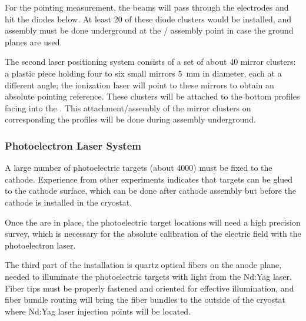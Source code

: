 For the pointing measurement, the beams will pass through the  electrodes and hit the diodes below. At least \num{20} of these diode clusters would be installed, and assembly must be done underground at the / assembly point in case the ground planes are used.


The second laser positioning system consists of a set of about \num{40} mirror clusters: a plastic piece holding four to six small mirrors \SI{5}{\mm} in diameter, each at a different angle; the ionization laser will point to these mirrors to obtain an absolute pointing reference. These clusters will be attached to the bottom  profiles facing into the . 
This attachment/assembly of the mirror clusters on corresponding the  profiles will be done during  assembly underground.



\subsubsection{Photoelectron Laser System} 
A large number of photoelectric targets (about \num{4000}) must be fixed to the cathode. Experience from other experiments indicates that targets can be glued to the cathode surface, which can be done after cathode assembly but before the cathode is installed in the cryostat. 

Once the  are in place, the photoelectric target locations will need a high precision survey, which is necessary for the absolute calibration of the electric field with the photoelectron laser. 

The third part of the installation is  quartz optical fibers on the anode plane, needed to illuminate  the photoelectric targets with light from the Nd:Yag  laser. %
Fiber tips must be properly fastened and oriented for effective illumination, and fiber bundle routing will bring the fiber bundles to the outside of the cryostat where Nd:Yag laser injection points will be located. 

